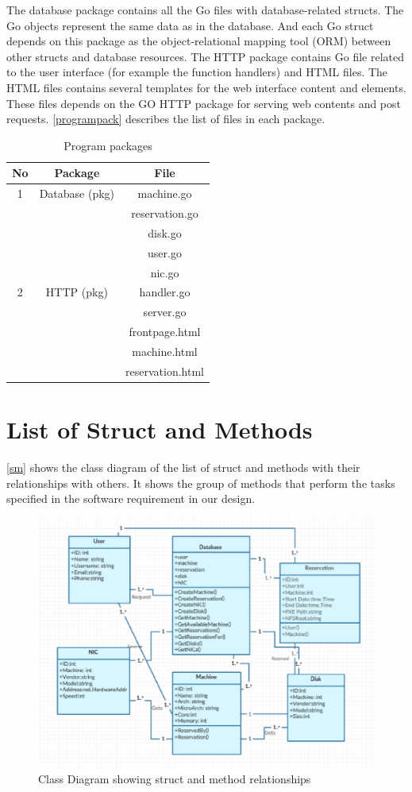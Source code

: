 The database package contains all the Go files with database-related structs. The Go objects represent the same data as in the database. And each Go struct depends on this package as the object-relational mapping tool (ORM) between other structs and database resources. The HTTP package contains Go file related to the user interface (for example the function handlers) and HTML files. The HTML files contains several templates for the web interface content and elements. These files depends on the GO HTTP package for serving web contents and post requests. \autoref{programpack} describes the list of files in each package.
\pagebreak
\begin{table}[h!]
  \centering
  \begin{tabular}{ccc}
    \hline
    No & Package & File\\
   \hline
    1 &Database (pkg)& machine.go\\
       &&reservation.go\\
      &&disk.go\\
      &&user.go\\
      &&nic.go\\
    \hline
    2 &HTTP (pkg)& handler.go\\
    &&server.go\\
    &&frontpage.html\\
    &&machine.html\\
    &&reservation.html\\
    \hline
  \end{tabular}
  \caption{Program packages}
  \label{programpack}
\end{table}

\section{List of Struct and Methods}
\autoref{sm} shows the class diagram of the list of struct and methods with their relationships with others. It shows the group of methods that perform the tasks specified in the software requirement in our design.
\begin{figure}[h!]
\includegraphics[width = \linewidth]{methods.eps}
\caption{Class Diagram showing struct and method relationships}
\label{sm} 
\end{figure}
\pagebreak
